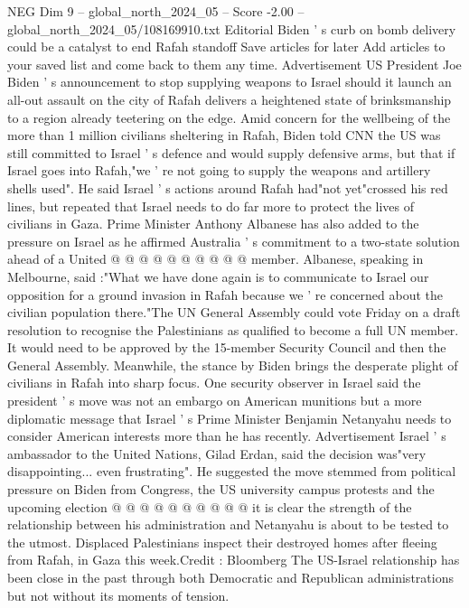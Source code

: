 \begin{textsample}{NEG Dim 9 – global\_north\_2024\_05 – Score -2.00 – global\_north\_2024\_05/108169910.txt}  \label{ex:f9_neg_156}
Editorial Biden ' s curb on bomb delivery could be a catalyst to end Rafah standoff Save articles for later Add articles to your saved list and come back to them any time.
Advertisement US President Joe Biden ' s announcement to stop supplying weapons to Israel should it launch an all-out assault on the city of Rafah delivers a heightened state of brinksmanship to a region already teetering on the edge.
Amid concern for the wellbeing of the more than 1 million civilians sheltering in Rafah, Biden told CNN the US was still committed to Israel ' s defence and would supply defensive arms, but that if Israel goes into Rafah,"we ' re not going to supply the weapons and artillery shells used".
He said Israel ' s actions around Rafah had"not yet"crossed his red lines, but repeated that Israel needs to do far more to protect the lives of civilians in Gaza.
Prime Minister Anthony Albanese has also added to the pressure on Israel as he affirmed Australia ' s commitment to a two-state solution ahead of a United @ @ @ @ @ @ @ @ @ @ member.
Albanese, speaking in Melbourne, said :"What we have done again is to communicate to Israel our opposition for a ground invasion in Rafah because we ' re concerned about the civilian population there."The UN General Assembly could vote Friday on a draft resolution to recognise the Palestinians as qualified to become a full UN member.
It would need to be approved by the 15-member Security Council and then the General Assembly.
Meanwhile, the stance by Biden brings the desperate plight of civilians in Rafah into sharp focus.
One security observer in Israel said the president ' s move was not an embargo on American munitions but a more diplomatic message that Israel ' s Prime Minister Benjamin Netanyahu needs to consider American interests more than he has recently.
Advertisement Israel ' s ambassador to the United Nations, Gilad Erdan, said the decision was"very disappointing... even frustrating".
He suggested the move stemmed from political pressure on Biden from Congress, the US university campus protests and the upcoming election @ @ @ @ @ @ @ @ @ @ it is clear the strength of the relationship between his administration and Netanyahu is about to be tested to the utmost.
Displaced Palestinians inspect their destroyed homes after fleeing from Rafah, in Gaza this week.Credit : Bloomberg The US-Israel relationship has been close in the past through both Democratic and Republican administrations but not without its moments of tension.

\end{textsample}
